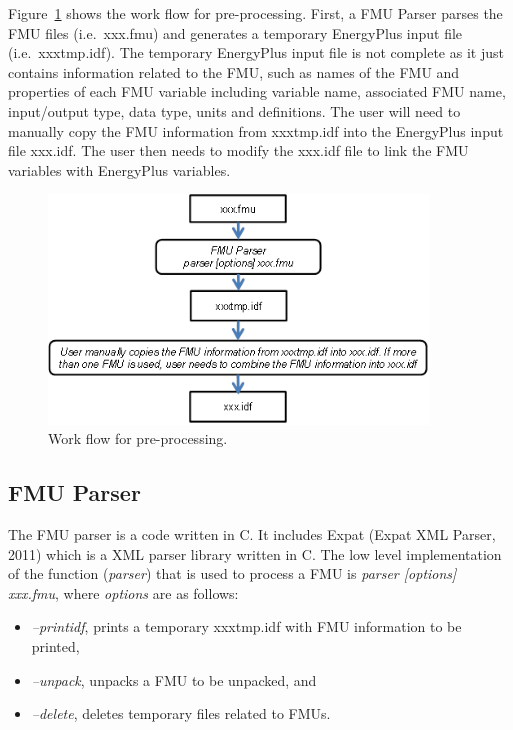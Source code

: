 Figure~\ref{fig:work-flow-for-pre-processing.} shows the work flow for pre-processing. First, a FMU Parser parses the FMU files (i.e.~xxx.fmu) and generates a temporary EnergyPlus input file (i.e.~xxxtmp.idf). The temporary EnergyPlus input file is not complete as it just contains information related to the FMU, such as names of the FMU and properties of each FMU variable including variable name, associated FMU name, input/output type, data type, units and definitions. The user will need to manually copy the FMU information from xxxtmp.idf into the EnergyPlus input file xxx.idf. The user then needs to modify the xxx.idf file to link the FMU variables with EnergyPlus variables.

\begin{figure}[hbtp] %
\centering
\includegraphics[width=0.9\textwidth, height=0.9\textheight, keepaspectratio=true]{media/image036.png}
\caption{Work flow for pre-processing. \protect \label{fig:work-flow-for-pre-processing.}}
\end{figure}

\subsection{FMU Parser}\label{fmu-parser}

The FMU parser is a code written in C. It includes Expat (Expat XML Parser, 2011) which is a XML parser library written in C. The low level implementation of the function (\emph{parser}) that is used to process a FMU is \emph{parser {[}options{]} xxx.fmu}, where \emph{options} are as follows:

\begin{itemize}
\item
  \emph{--printidf}, prints a temporary xxxtmp.idf with FMU information to be printed,
\item
  \emph{--unpack}, unpacks a FMU to be unpacked, and
\item
  \emph{--delete}, deletes temporary files related to FMUs.
\end{itemize}

